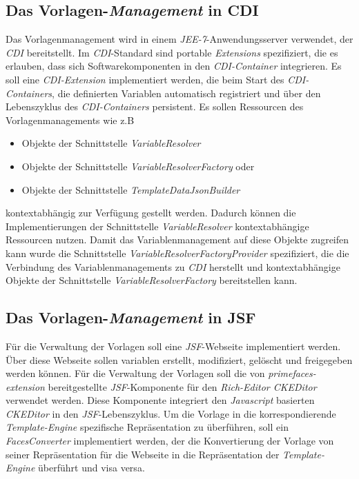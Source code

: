 \subsection{Das Vorlagen-\emph{Management} in CDI}
\label{sec:sub-template-management-cdi}
Das Vorlagenmanagement wird in einem \emph{JEE-7}-Anwendungsserver verwendet, der \emph{CDI} bereitstellt. Im \emph{CDI}-Standard sind portable \emph{Extensions} spezifiziert, die es erlauben, dass sich Softwarekomponenten in den \emph{CDI-Container} integrieren. Es soll eine \emph{CDI-Extension} implementiert werden, die beim Start des \emph{CDI-Containers}, die definierten Variablen automatisch registriert und über den Lebenszyklus des \emph{CDI-Containers} persistent. Es sollen Ressourcen des Vorlagenmanagements wie z.B
\begin{itemize}
	\item Objekte der Schnittstelle \emph{VariableResolver}
	\item Objekte der Schnittstelle \emph{VariableResolverFactory} oder
	\item Objekte der Schnittstelle \emph{TemplateDataJsonBuilder}
\end{itemize}
kontextabhängig zur Verfügung gestellt werden. Dadurch können die Implementierungen der Schnittstelle \emph{VariableResolver} kontextabhängige Ressourcen nutzen. Damit das Variablenmanagement auf diese Objekte zugreifen kann wurde die Schnittstelle \emph{VariableResolverFactoryProvider} spezifiziert, die die Verbindung des Variablenmanagements zu \emph{CDI} herstellt und kontextabhängige Objekte der Schnittstelle \emph{VariableResolverFactory} bereitstellen kann.

\subsection{Das Vorlagen-\emph{Management} in JSF}
Für die Verwaltung der Vorlagen soll eine \emph{JSF}-Webseite implementiert werden. Über diese Webseite sollen variablen erstellt, modifiziert, gelöscht und freigegeben werden können. Für die Verwaltung der Vorlagen soll die von \emph{primefaces-extension} bereitgestellte \emph{JSF}-Komponente für den \emph{Rich-Editor CKEDitor} verwendet werden. Diese Komponente integriert den \emph{Javascript} basierten \emph{CKEDitor} in den \emph{JSF}-Lebenszyklus. Um die Vorlage in die korrespondierende \emph{Template-Engine} spezifische Repräsentation zu überführen, soll ein \emph{FacesConverter} implementiert werden, der die Konvertierung der Vorlage von seiner Repräsentation für die Webseite in die Repräsentation der \emph{Template-Engine} überführt und visa versa.

